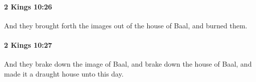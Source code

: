 		\paragraph{2 Kings 10:26} %
			\label{2KINGS-10-26}

			And they brought forth the images out of the house of Baal, and burned them.


		\paragraph{2 Kings 10:27} %
			\label{2KINGS-10-27}

			And they brake down the image of Baal, and brake down the house of Baal, and made it a draught house unto this day.


